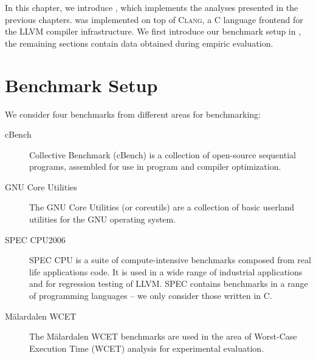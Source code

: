 In this chapter, we introduce \sloopy{}, which implements the analyses presented in the previous chapters. \sloopy{} was implemented on top of \textsc{Clang}, a C language frontend for the \textsc{LLVM} compiler infrastructure. We first introduce our benchmark setup in , the remaining sections contain data obtained during empiric evaluation.

\section{Benchmark Setup}
\label{sec:benchmark_setup}

We consider four benchmarks from different areas for benchmarking:

\begin{description}
    \item[cBench \cite{cBench}] Collective Benchmark (cBench) is a collection of open-source sequential programs, assembled for use in program and compiler optimization.
    \item[GNU Core Utilities \cite{coreutils}] The GNU Core Utilities (or coreutils) are a collection of basic userland utilities for the GNU operating system.
    \item[SPEC CPU2006 \cite{DBLP:journals/sigarch/Henning06}] SPEC CPU is a suite of compute-intensive benchmarks composed from real life applications code. It is used in a wide range of industrial applications and for regression testing of LLVM. SPEC contains benchmarks in a range of programming languages -- we only consider those written in C.
    \item[M{\"a}lardalen WCET \cite{DBLP:conf/wcet/GustafssonBEL10}] The Mälardalen WCET benchmarks are used in the area of Worst-Case Execution Time (WCET) analysis for experimental evaluation.
\end{description}



